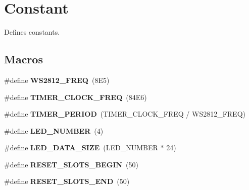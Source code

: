 \hypertarget{group___constant}{}\section{Constant}
\label{group___constant}


Defines constants.  


\subsection*{Macros}
\begin{DoxyCompactItemize}
\item 
\mbox{\label{group___constant_ga857df980c46f31dbe009560d826413a8}} 
\#define {\bfseries W\+S2812\+\_\+\+F\+R\+EQ}~(8\+E5)
\item 
\mbox{\label{group___constant_ga5f1fac9f0aaabad0683c04e44a1aefe9}} 
\#define {\bfseries T\+I\+M\+E\+R\+\_\+\+C\+L\+O\+C\+K\+\_\+\+F\+R\+EQ}~(84\+E6)
\item 
\mbox{\label{group___constant_gad888acf7c13a4bedd6541ceb5cf9bf6d}} 
\#define {\bfseries T\+I\+M\+E\+R\+\_\+\+P\+E\+R\+I\+OD}~(T\+I\+M\+E\+R\+\_\+\+C\+L\+O\+C\+K\+\_\+\+F\+R\+EQ / W\+S2812\+\_\+\+F\+R\+EQ)
\item 
\mbox{\label{group___constant_ga306db1a2fccc9c26ad114b50a88940d3}} 
\#define {\bfseries L\+E\+D\+\_\+\+N\+U\+M\+B\+ER}~(4)
\item 
\mbox{\label{group___constant_ga7af472c9efcf021651c589bb54d103fa}} 
\#define {\bfseries L\+E\+D\+\_\+\+D\+A\+T\+A\+\_\+\+S\+I\+ZE}~(L\+E\+D\+\_\+\+N\+U\+M\+B\+ER $\ast$ 24)
\item 
\mbox{\label{group___constant_ga38b56d14857b32e86b876a32957a2b63}} 
\#define {\bfseries R\+E\+S\+E\+T\+\_\+\+S\+L\+O\+T\+S\+\_\+\+B\+E\+G\+IN}~(50)
\item 
\mbox{\label{group___constant_ga91e46b7f75ff75a4719a9d7f589df5a3}} 
\#define {\bfseries R\+E\+S\+E\+T\+\_\+\+S\+L\+O\+T\+S\+\_\+\+E\+ND}~(50)
\item 
\mbox{\label{group___constant_gacbccf04b27120fd8ba0a8eae7866291f}} 

\end{DoxyCompactItemize}
